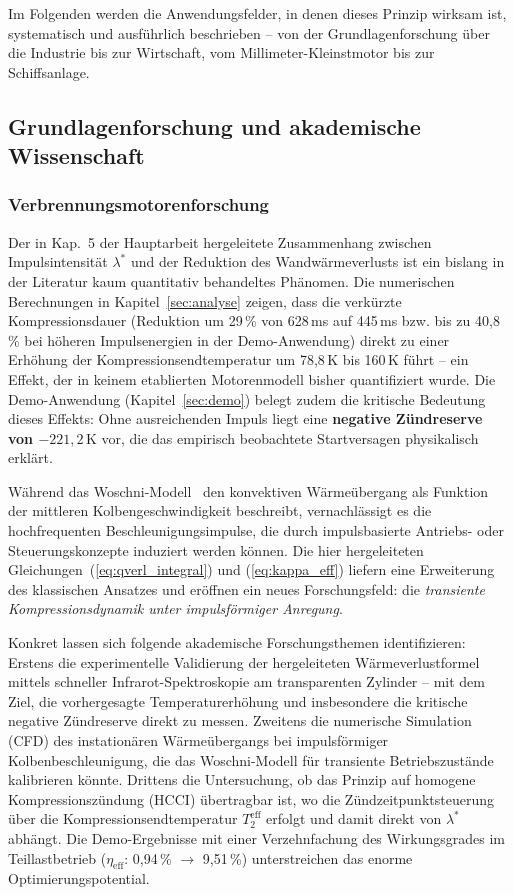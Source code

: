 ﻿\documentclass[a4paper,12pt]{article}
\begin{document}
Im Folgenden werden die Anwendungsfelder, in denen dieses Prinzip wirksam ist,
systematisch und ausführlich beschrieben -- von der Grundlagenforschung über die
Industrie bis zur Wirtschaft, vom Millimeter-Kleinstmotor bis zur Schiffsanlage.

\subsection{Grundlagenforschung und akademische Wissenschaft}

\subsubsection{Verbrennungsmotorenforschung}

Der in Kap.~5 der Hauptarbeit hergeleitete Zusammenhang zwischen
Impulsintensität $\lambda^*$ und der Reduktion des Wandwärmeverlusts
ist ein bislang in der Literatur kaum quantitativ behandeltes Phänomen.
Die numerischen Berechnungen in Kapitel~\ref{sec:analyse} zeigen, dass
die verkürzte Kompressionsdauer (Reduktion um 29\,\% von 628\,ms auf 445\,ms
bzw. bis zu 40{,}8\,\% bei höheren Impulsenergien in der Demo-Anwendung)
direkt zu einer Erhöhung der Kompressionsendtemperatur um 78{,}8\,K bis
160\,K führt -- ein Effekt, der in keinem etablierten Motorenmodell
bisher quantifiziert wurde. Die Demo-Anwendung (Kapitel~\ref{sec:demo})
belegt zudem die kritische Bedeutung dieses Effekts: Ohne ausreichenden
Impuls liegt eine \textbf{negative Zündreserve von $-221{,}2\,\text{K}$} vor,
die das empirisch beobachtete Startversagen physikalisch erklärt.

Während das Woschni-Modell~\cite{heywood1988} den konvektiven
Wärmeübergang als Funktion der mittleren Kolbengeschwindigkeit beschreibt,
vernachlässigt es die hochfrequenten Beschleunigungsimpulse, die durch
impulsbasierte Antriebs- oder Steuerungskonzepte induziert werden können.
Die hier hergeleiteten Gleichungen~(\ref{eq:qverl_integral}) und
(\ref{eq:kappa_eff}) liefern eine Erweiterung des klassischen Ansatzes
und eröffnen ein neues Forschungsfeld: die \textit{transiente
	Kompressionsdynamik unter impulsförmiger Anregung}.

Konkret lassen sich folgende akademische Forschungsthemen identifizieren:
Erstens die experimentelle Validierung der hergeleiteten Wärmeverlustformel
mittels schneller Infrarot-Spektroskopie am transparenten Zylinder -- mit dem
Ziel, die vorhergesagte Temperaturerhöhung und insbesondere die kritische
negative Zündreserve direkt zu messen. Zweitens die numerische Simulation (CFD)
des instationären Wärmeübergangs bei impulsförmiger Kolbenbeschleunigung,
die das Woschni-Modell für transiente Betriebszustände kalibrieren könnte.
Drittens die Untersuchung, ob das Prinzip auf homogene Kompressionszündung (HCCI)
übertragbar ist, wo die Zündzeitpunktsteuerung über die Kompressionsendtemperatur
$T_2^\text{eff}$ erfolgt und damit direkt von $\lambda^*$ abhängt. Die
Demo-Ergebnisse mit einer Verzehnfachung des Wirkungsgrades im Teillastbetrieb
($\eta_\text{eff}$: 0{,}94\,\% $\rightarrow$ 9{,}51\,\%) unterstreichen
das enorme Optimierungspotential.
\end{document}
